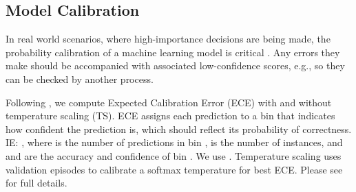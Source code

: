 \documentclass[10pt,twocolumn,letterpaper]{article}
\begin{document}
\subsection{Model Calibration}


In real world scenarios, where high-importance decisions are being made, the probability calibration of a machine learning model is critical \cite{guo2017calibration}. Any errors they make should be accompanied with associated low-confidence scores, e.g., so they can be checked by another process. 

Following \cite{nixon2019measuring,guo2017calibration}, we compute Expected Calibration Error (ECE) with and without temperature scaling (TS). ECE assigns each prediction to a bin that indicates how confident the prediction is, which should reflect its probability of correctness. IE: , where  is the number of predictions in bin ,  is the number of instances, and  and  are the accuracy and confidence of bin . We use . Temperature scaling uses validation episodes to calibrate a softmax temperature for best ECE. Please see \cite{nixon2019measuring,guo2017calibration} for full details. 
\end{document}
